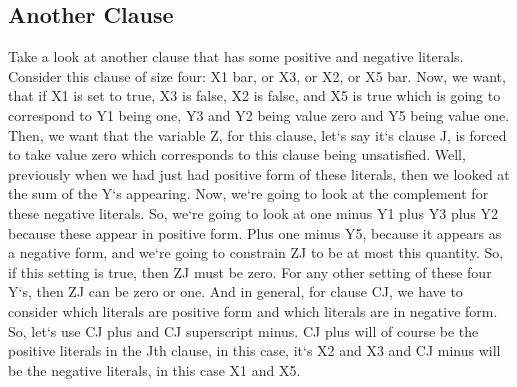 \subsection{Another Clause}
Take a look at another clause that has some positive and negative literals.
Consider this clause of size four: X1 bar, or X3, or X2, or X5 bar.
Now, we want, that if X1 is set to true, X3 is false, X2 is false, and X5 is true which is going to correspond to Y1 being one, Y3 and Y2 being value zero and Y5 being value one.
Then, we want that the variable Z, for this clause, let`s say it`s clause J, is forced to take value zero which corresponds to this clause being unsatisfied.
Well, previously when we had just had positive form of these literals, then we looked at the sum of the Y`s appearing.
Now, we`re going to look at the complement for these negative literals.
So, we`re going to look at one minus Y1 plus Y3 plus Y2 because these appear in positive form.
Plus one minus Y5, because it appears as a negative form, and we`re going to constrain ZJ to be at most this quantity.
So, if this setting is true, then ZJ must be zero.
For any other setting of these four Y`s, then ZJ can be zero or one.
And in general, for clause CJ, we have to consider which literals are positive form and which literals are in negative form.
So, let`s use CJ plus and CJ superscript minus.
CJ plus will of course be the positive literals in the Jth clause, in this case, it`s X2 and X3 and CJ minus will be the negative literals, in this case X1 and X5.

